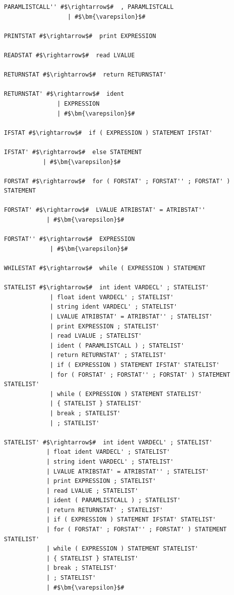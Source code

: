 \documentclass[
	12pt,				%
	openright,			%
	twoside,			%
	a4paper,			%
	english,			%
	french,				%
	spanish,			%
	brazil				%
	]{abntex2}
\begin{document}
\begin{lstlisting}[escapechar=\#]
PARAMLISTCALL'' #$\rightarrow$#  , PARAMLISTCALL 
                  | #$\bm{\varepsilon}$# 

PRINTSTAT #$\rightarrow$#  print EXPRESSION 

READSTAT #$\rightarrow$#  read LVALUE 

RETURNSTAT #$\rightarrow$#  return RETURNSTAT' 

RETURNSTAT' #$\rightarrow$#  ident 
               | EXPRESSION 
               | #$\bm{\varepsilon}$# 

IFSTAT #$\rightarrow$#  if ( EXPRESSION ) STATEMENT IFSTAT' 

IFSTAT' #$\rightarrow$#  else STATEMENT 
           | #$\bm{\varepsilon}$# 

FORSTAT #$\rightarrow$#  for ( FORSTAT' ; FORSTAT'' ; FORSTAT' ) STATEMENT 

FORSTAT' #$\rightarrow$#  LVALUE ATRIBSTAT' = ATRIBSTAT'' 
            | #$\bm{\varepsilon}$# 

FORSTAT'' #$\rightarrow$#  EXPRESSION 
             | #$\bm{\varepsilon}$# 

WHILESTAT #$\rightarrow$#  while ( EXPRESSION ) STATEMENT 

STATELIST #$\rightarrow$#  int ident VARDECL' ; STATELIST' 
             | float ident VARDECL' ; STATELIST' 
             | string ident VARDECL' ; STATELIST' 
             | LVALUE ATRIBSTAT' = ATRIBSTAT'' ; STATELIST' 
             | print EXPRESSION ; STATELIST' 
             | read LVALUE ; STATELIST' 
             | ident ( PARAMLISTCALL ) ; STATELIST' 
             | return RETURNSTAT' ; STATELIST' 
             | if ( EXPRESSION ) STATEMENT IFSTAT' STATELIST' 
             | for ( FORSTAT' ; FORSTAT'' ; FORSTAT' ) STATEMENT STATELIST' 
             | while ( EXPRESSION ) STATEMENT STATELIST' 
             | { STATELIST } STATELIST' 
             | break ; STATELIST' 
             | ; STATELIST'

STATELIST' #$\rightarrow$#  int ident VARDECL' ; STATELIST' 
            | float ident VARDECL' ; STATELIST' 
            | string ident VARDECL' ; STATELIST' 
            | LVALUE ATRIBSTAT' = ATRIBSTAT'' ; STATELIST' 
            | print EXPRESSION ; STATELIST' 
            | read LVALUE ; STATELIST' 
            | ident ( PARAMLISTCALL ) ; STATELIST' 
            | return RETURNSTAT' ; STATELIST' 
            | if ( EXPRESSION ) STATEMENT IFSTAT' STATELIST' 
            | for ( FORSTAT' ; FORSTAT'' ; FORSTAT' ) STATEMENT STATELIST' 
            | while ( EXPRESSION ) STATEMENT STATELIST' 
            | { STATELIST } STATELIST' 
            | break ; STATELIST' 
            | ; STATELIST' 
            | #$\bm{\varepsilon}$# 


\end{lstlisting}
\end{document}

